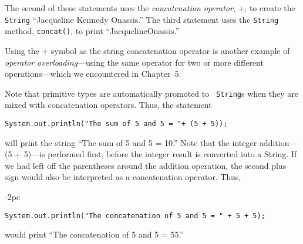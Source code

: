 \noindent The second of these statements uses the {\it concatenation
operator}, $+$, to create the {\tt String} ``Jacqueline Kennedy Onassis.''
The third statement uses the {\tt String} method, {\tt concat()},
to print ``JacquelineOnassis.''

\noindent Using the + symbol as the string concatenation operator is
 another example of {\it operator
overloading}---using the same operator for two or more different
operations---which we encountered in Chapter~5.


\noindent Note that primitive types are automatically promoted to {\tt
String}s when they are mixed with concatenation operators.  Thus, the
statement

\begin{jjjlisting}
\begin{lstlisting}
System.out.println("The sum of 5 and 5 = "+ (5 + 5));
\end{lstlisting}
\end{jjjlisting}

\noindent will print the string ``The sum of 5 and 5 = 10.''  Note
that the integer addition---(5 + 5)---is performed first, before the
integer result is converted into a String.  If we had left off the
parentheses around the addition operation, the second plus sign would
also be interpreted as a concatenation operator. Thus,

\begin{jjjlistingleft}[28pc]{-2pc}
\begin{lstlisting}
System.out.println("The concatenation of 5 and 5 = " + 5 + 5);
\end{lstlisting}
\end{jjjlistingleft}

\noindent would print ``The concatenation of 5 and 5 = 55.''

